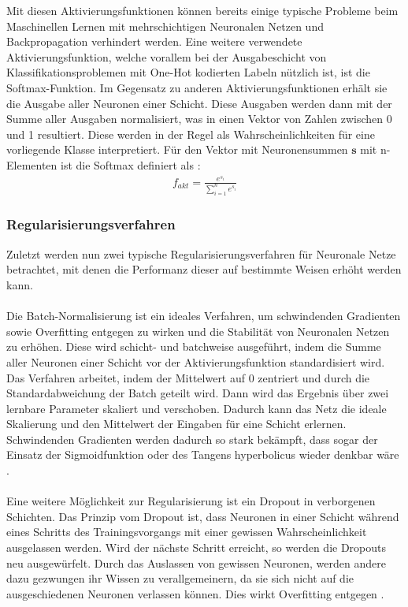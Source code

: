 \documentclass[11pt,bibliography=totocnumbered]{scrartcl}
\newcommand{\myequations}[1]{%
\addcontentsline{equ}{myequations}{\protect\numberline{\theequation}#1}}
\begin{document}
Mit diesen Aktivierungsfunktionen können bereits einige typische Probleme beim Maschinellen Lernen mit mehrschichtigen Neuronalen Netzen und Backpropagation verhindert werden. Eine weitere verwendete Aktivierungsfunktion, welche vorallem bei der Ausgabeschicht von Klassifikationsproblemen mit One-Hot kodierten Labeln nützlich ist, ist die Softmax-Funktion. Im Gegensatz zu anderen Aktivierungsfunktionen erhält sie die Ausgabe aller Neuronen einer Schicht. Diese Ausgaben werden dann mit der Summe aller Ausgaben normalisiert, was in einen Vektor von Zahlen zwischen 0 und 1 resultiert. Diese werden in der Regel als Wahrscheinlichkeiten für eine vorliegende Klasse interpretiert. Für den Vektor mit Neuronensummen \ensuremath{\textbf{s}} mit n-Elementen ist die Softmax definiert als \cite[S.37]{BA}\cite[S.141-142, S.263]{MACHINE_LEARNING}: 
\begin{equation}
\label{eq:softmax}
\begin{aligned}
f_{akt} = \frac{e^{s_i}}{\sum_{i=1}^{n}e^{s_i}}
\end{aligned}
\end{equation}\myequations{Softmax}
\subsubsection{Regularisierungsverfahren}
Zuletzt werden nun zwei typische Regularisierungsverfahren für Neuronale Netze betrachtet, mit denen die Performanz dieser auf bestimmte Weisen erhöht werden kann.
\\\\
Die Batch-Normalisierung ist ein ideales Verfahren, um schwindenden Gradienten sowie Overfitting entgegen zu wirken und die Stabilität von Neuronalen Netzen zu erhöhen. Diese wird schicht- und batchweise ausgeführt, indem die Summe aller Neuronen einer Schicht vor der Aktivierungsfunktion standardisiert wird. Das Verfahren arbeitet, indem der Mittelwert auf 0 zentriert und durch die Standardabweichung der Batch geteilt wird. Dann wird das Ergebnis über zwei lernbare Parameter skaliert und verschoben. Dadurch kann das Netz die ideale Skalierung und den Mittelwert der Eingaben für eine Schicht erlernen. Schwindenden Gradienten werden dadurch so stark bekämpft, dass sogar der Einsatz der Sigmoidfunktion oder des Tangens hyperbolicus wieder denkbar wäre \cite[S.37-38]{BA}\cite[S.282-283]{MACHINE_LEARNING}.
\\\\
Eine weitere Möglichkeit zur Regularisierung ist ein Dropout in verborgenen Schichten. Das Prinzip vom Dropout ist, dass Neuronen in einer Schicht während eines Schritts des Trainingsvorgangs mit einer gewissen Wahrscheinlichkeit ausgelassen werden. Wird der nächste Schritt erreicht, so werden die Dropouts neu ausgewürfelt. Durch das Auslassen von gewissen Neuronen, werden andere dazu gezwungen ihr Wissen zu verallgemeinern, da sie sich nicht auf die ausgeschiedenen Neuronen verlassen können. Dies wirkt Overfitting entgegen \cite[S.38-39]{BA}\cite[S.205-206]{NNP}.
\end{document}
